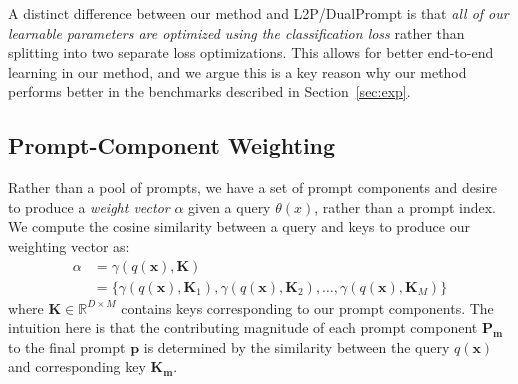 A distinct difference between our method and L2P/DualPrompt is that \emph{all of our learnable parameters are optimized using the classification loss} rather than splitting into two separate loss optimizations. This allows for better end-to-end learning in our method, and we argue this is a key reason why our method performs better in the benchmarks described in Section~\ref{sec:exp}.

\subsection{Prompt-Component Weighting}

Rather than a pool of prompts, we have a set of prompt components and desire to produce a \emph{weight vector} $\alpha$ given a query $\theta(x)$, rather than a prompt index. We compute the cosine similarity between a query and keys to produce our weighting vector as:
\begin{equation}
\begin{aligned}
\alpha &= \gamma(q(\bm{x}),\bm{K}) \\
&= \{ \gamma(q(\bm{x}),\bm{K}_1),\gamma(q(\bm{x}),\bm{K}_2),\ldots, \gamma(q(\bm{x}),\bm{K}_M)\}
\label{eq:prompt_weight_a}
\end{aligned}
\end{equation}
where $\bm{K} \in \mathbb{R}^{D \times M}$ contains keys corresponding to our prompt components. The intuition here is that the contributing magnitude of each prompt component $\bm{P_m}$ to the final prompt $\bm{p}$ is determined by the similarity between the query $q(\bm{x})$ and corresponding key $\bm{K_m}$.

